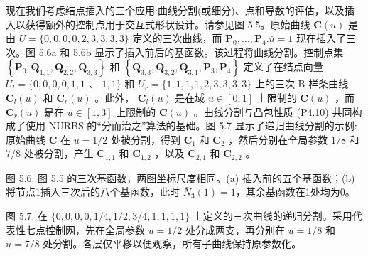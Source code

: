 \documentclass[../main.tex]{subfiles}
\begin{document}
现在我们考虑结点插入的三个应用:曲线分割(或细分)、点和导数的评估，以及插入以获得额外的控制点用于交互式形状设计。请参见图 5.5。原始曲线 \(\mathbf{C}\left( u\right)\) 是由 \(U = \{ 0,0,0,0,2,3,3,3,3\}\) 定义的三次曲线，而 \({\mathbf{P}}_{0},\ldots ,{\mathbf{P}}_{4}.\bar{u} = 1\) 现在插入了三次。图 5.6a 和 5.6b 显示了插入前后的基函数。该过程将曲线分割。控制点集 \(\left\{  {{\mathbf{P}}_{0},{\mathbf{Q}}_{1,1},{\mathbf{Q}}_{2,2},{\mathbf{Q}}_{3,3}}\right\}\) 和 \(\left\{  {{\mathbf{Q}}_{3,3},{\mathbf{Q}}_{3,2},{\mathbf{Q}}_{3,1},{\mathbf{P}}_{3},{\mathbf{P}}_{4}}\right\}\) 定义了在结点向量 \({U}_{l} = \{ 0,0,0,0,1,1\) 、 \(1,1\}\) 和 \({U}_{r} = \{ 1,1,1,1,2,3,3,3,3\}\) 上的三次 B 样条曲线 \({\mathbf{C}}_{l}\left( u\right)\) 和 \({\mathbf{C}}_{r}\left( u\right)\) 。此外， \({\mathbf{C}}_{l}\left( u\right)\) 是在域 \(u \in  \left\lbrack  {0,1}\right\rbrack\) 上限制的 \(\mathbf{C}\left( u\right)\) ，而 \({\mathbf{C}}_{r}\left( u\right)\) 是在 \(u \in  \left\lbrack  {1,3}\right\rbrack\) 上限制的 \(\mathbf{C}\left( u\right)\) 。曲线分割与凸包性质 (P4.10) 共同构成了使用 NURBS 的“分而治之”算法的基础。图 5.7 显示了递归曲线分割的示例:原始曲线 \(\mathbf{C}\) 在 \(u = 1/2\) 处被分割，得到 \({\mathbf{C}}_{1}\) 和 \({\mathbf{C}}_{2}\) ，然后分别在全局参数 \(1/8\) 和 \(7/8\) 处被分割，产生 \({\mathbf{C}}_{1,1}\) 和 \({\mathbf{C}}_{1,2}\) ，以及 \({\mathbf{C}}_{2,1}\) 和 \({\mathbf{C}}_{2,2}\) 。

\begin{center}
\begin{minipage}{18cm}
\vspace*{.6\baselineskip}
\centering
{}
\par\smallskip
图 5.6. 图 5.5 的三次基函数，两图坐标尺度相同。(a) 插入前的五个基函数；(b) 将节点1插入三次后的八个基函数，此时 \(\bar N_3(1)=1\)，其余基函数在1处均为0。
\end{minipage}
\end{center}

\begin{center}
\begin{minipage}{18cm}
\vspace*{.6\baselineskip}
\centering
{}
\par\smallskip
图 5.7. 在 \(\{0,0,0,0,1/4,1/2,3/4,1,1,1,1\}\) 上定义的三次曲线的递归分割。采用代表性七点控制网，先在全局参数 \(u=1/2\) 处分成两支，再分别在 \(u=1/8\) 和 \(u=7/8\) 处分割。各层仅平移以便观察，所有子曲线保持原参数化。
\end{minipage}
\end{center}
\end{document}
